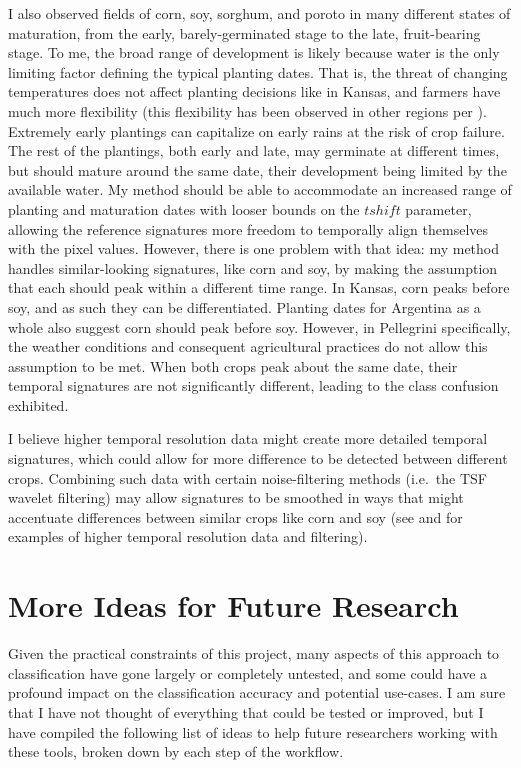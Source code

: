 I also observed fields of corn, soy, sorghum, and poroto in many different states of maturation, from the early, barely-germinated stage to the late, fruit-bearing stage. To me, the broad range of development is likely because water is the only limiting factor defining the typical planting dates. That is, the threat of changing temperatures does not affect planting decisions like in Kansas, and farmers have much more flexibility (this flexibility has been observed in other regions per \textcite{sacks2010crop}). Extremely early plantings can capitalize on early rains at the risk of crop failure. The rest of the plantings, both early and late, may germinate at different times, but should mature around the same date, their development being limited by the available water. My method should be able to accommodate an increased range of planting and maturation dates with looser bounds on the $tshift$ parameter, allowing the reference signatures more freedom to temporally align themselves with the pixel values. However, there is one problem with that idea: my method handles similar-looking signatures, like corn and soy, by making the assumption that each should peak within a different time range. In Kansas, corn peaks before soy, and as such they can be differentiated. Planting dates for Argentina as a whole also suggest corn should peak before soy. However, in Pellegrini specifically, the weather conditions and consequent agricultural practices do not allow this assumption to be met. When both crops peak about the same date, their temporal signatures are not significantly different, leading to the class confusion exhibited.

I believe higher temporal resolution data might create more detailed temporal signatures, which could allow for more difference to be detected between different crops. Combining such data with certain noise-filtering methods (i.e.\ the TSF wavelet filtering) may allow signatures to be smoothed in ways that might accentuate differences between similar crops like corn and soy (see \textcite{doraiswamy2006improved} and \textcite{sakamoto2010a-two-step} for examples of higher temporal resolution data and filtering).


\section{More Ideas for Future Research}

Given the practical constraints of this project, many aspects of this approach to classification have gone largely or completely untested, and some could have a profound impact on the classification accuracy and potential use-cases. I am sure that I have not thought of everything that could be tested or improved, but I have compiled the following list of ideas to help future researchers working with these tools, broken down by each step of the workflow.

